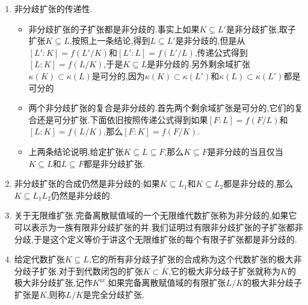 \begin{enumerate}
\begin{proof}
		于是这一串不等式也都取等号,于是$[L':K']=[\lambda':\kappa']$,于是$K'\subseteq L'$是非分歧的.
	\end{proof}
	\item 非分歧扩张的传递性.
	\begin{itemize}
		\item 非分歧扩张的子扩张都是非分歧的.事实上如果$K\subseteq L'$是非分歧扩张,取子扩张$K\subseteq L$,按照上一条结论,得到$L\subseteq L'$是非分歧的,但是从$[L':K]=f(L'/K)$和$[L':L]=f(L'/L)$,传递公式得到$[L:K]=f(L/K)$,于是$K\subseteq L$是非分歧的.另外剩余域扩张$\kappa(K)\subset\kappa(L)$是可分的,因为$\kappa(K)\subset\kappa(L')$和$\kappa(L)\subset\kappa(L')$都是可分的
		\item 两个非分歧扩张的复合是非分歧的.首先两个剩余域扩张是可分的,它们的复合还是可分扩张.下面依旧按照传递公式得到如果$[F:L]=f(F/L)$和$[L:K]=f(L/K)$,那么$[F:K]=f(F/K)$.
		\item 上两条结论说明,给定扩张$K\subseteq L\subseteq F$,那么$K\subseteq F$是非分歧的当且仅当$K\subseteq L$和$L\subseteq F$都是非分歧扩张.
	\end{itemize}
	\item 非分歧扩张的合成仍然是非分歧的:如果$K\subseteq L_1$和$K\subseteq L_2$都是非分歧的,那么$K\subseteq L_1L_2$仍然是非分歧的.
	\item 关于无限维扩张.完备离散赋值域的一个无限维代数扩张称为非分歧的,如果它可以表示为一族有限非分歧扩张的并.我们证明过有限非分歧扩张的子扩张都非分歧,于是这个定义等价于讲这个无限维扩张的每个有限子扩张都是非分歧的.
	\item 给定代数扩张$K\subseteq L$,它的所有非分歧子扩张的合成称为这个代数扩张的极大非分歧子扩张.对于到代数闭包的扩张$K\subset\overline{K}$,它的极大非分歧子扩张就称为$K$的极大非分歧扩张,记作$K^{\mathrm{nr}}$.如果完备离散赋值域的有限扩张$L/K$的极大非分歧子扩张是$K$,则称$L/K$是完全分歧扩张.
\end{enumerate}


